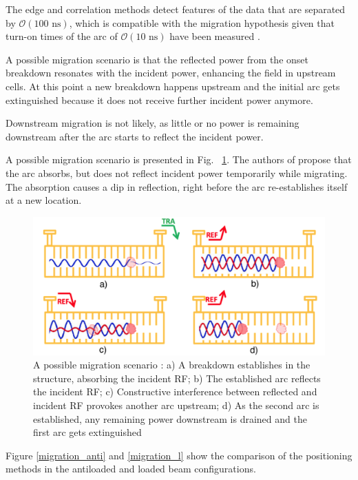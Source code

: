 The edge and correlation methods detect features of the data that are separated by $\mathcal{O}(100 \text{ ns})$, which is compatible with the migration hypothesis given that turn-on times of the arc of $\mathcal{O}(10 \text{ ns})$ have been measured \cite{Shipman:1999457,Shipman:1459884}.





A possible migration scenario is that the reflected power from the onset breakdown resonates with the incident power, enhancing the field in upstream cells. At this point a new breakdown happens upstream and the initial arc gets extinguished because it does not receive further incident power anymore. 

Downstream migration is not likely, as little or no power is remaining downstream after the arc starts to reflect the incident power. 

A possible migration scenario is presented in Fig.~ \ref{mig_sc}. The authors of \cite{Degiovanni:migration} propose that the arc absorbs, but does not reflect incident power temporarily while migrating. The absorption causes a dip in reflection, right before the arc re-establishes itself at a new location.

\begin{figure}[h]
\centering 
\includegraphics[scale=0.3]{pictures/migration_scenario}
\caption{A possible migration scenario \cite{Degiovanni:migration}: a) A breakdown establishes in the structure, absorbing the incident RF; b) The established arc reflects the incident RF; c) Constructive interference between reflected and incident RF provokes another arc upstream; d) As the second arc is established, any remaining power downstream is drained and the first arc gets extinguished}
\label{mig_sc}
\end{figure}

Figure \ref{migration_anti} and \ref{migration_l} show the comparison of the positioning methods in the antiloaded and loaded beam configurations.  

